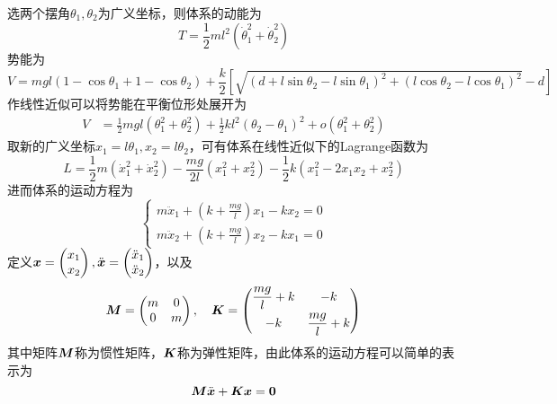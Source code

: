 \begin{example}[弹性耦合摆]
选两个摆角$\theta_1,\theta_2$为广义坐标，则体系的动能为
\begin{equation*}
	T = \frac12 ml^2 \left(\dot{\theta}_1^2+\dot{\theta}_2^2\right)
\end{equation*}
势能为
\begin{equation*}
	V = mgl(1-\cos \theta_1+ 1-\cos \theta_2) + \frac{k}{2} \left[\sqrt{(d+l\sin \theta_2-l\sin \theta_1)^2+(l\cos \theta_2-l\cos \theta_1)^2} - d\right]
\end{equation*}
作线性近似可以将势能在平衡位形处展开为
\begin{align*}
	V & = \frac12 mgl(\theta_1^2+\theta_2^2) + \frac12 kl^2 (\theta_2-\theta_1)^2 + o(\theta_1^2+\theta_2^2)
\end{align*}
取新的广义坐标$x_1 = l\theta_1,x_2 = l\theta_2$，可有体系在线性近似下的Lagrange函数为
\begin{equation*}
	L = \frac12 m(\dot{x}_1^2+\dot{x}_2^2) - \frac{mg}{2l} (x_1^2+x_2^2) - \frac12 k(x_1^2-2x_1x_2+x_2^2)
\end{equation*}
进而体系的运动方程为
\begin{equation*}
	\begin{cases}
		\displaystyle m\ddot{x}_1 + \left(k +\frac{mg}{l}\right) x_1 - kx_2 = 0 \\[1.5ex]
		\displaystyle m\ddot{x}_2 + \left(k +\frac{mg}{l}\right) x_2 - kx_1 = 0
	\end{cases}
\end{equation*}
定义$\boldsymbol{x} = \begin{pmatrix} x_1 \\ x_2 \end{pmatrix},\ddot{\boldsymbol{x}} = \begin{pmatrix} \ddot{x}_1 \\ \ddot{x}_2 \end{pmatrix}$，以及
\begin{equation*}
	\boldsymbol{M} = \begin{pmatrix} m & 0 \\ 0 & m \end{pmatrix},\quad \boldsymbol{K} = \begin{pmatrix} \dfrac{mg}{l}+k & -k \\[1.5ex] -k & \dfrac{mg}{l} + k \end{pmatrix}
\end{equation*}
其中矩阵$\boldsymbol{M}$称为{\heiti 惯性矩阵}，$\boldsymbol{K}$称为{\heiti 弹性矩阵}，由此体系的运动方程可以简单的表示为
\begin{equation*}
	\mbf{M} \ddot{\mbf{x}} + \mbf{K} \mbf{x} = \mbf{0}

\end{equation*}
\end{example}
